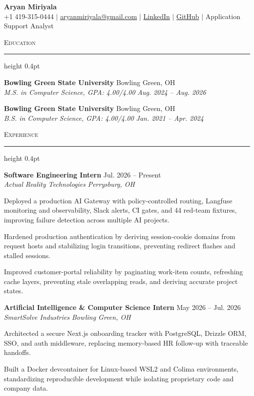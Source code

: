 \documentclass[letterpaper,11pt]{article}
\newcommand{\resumesection}[1]{%
  \par\vspace{2pt}%
  {\large\scshape #1}\par\vspace{2pt}%
  \hrule height 0.4pt\vspace{2pt}%
}
\newcommand{\resumeSubheading}[4]{
  \textbf{#1} \hfill #2\\
  \textit{#3} \hfill \textit{#4}
}
\begin{document}
\begin{center}
  {\LARGE \textbf{Aryan Miriyala}}\\[-1pt]
  \small
  +1 419-315-0444 $|$
  \href{mailto:aryanmiriyala@gmail.com}{aryanmiriyala@gmail.com} $|$
  \href{https://www.linkedin.com/in/aryan-miriyala-7788a21b6/}{LinkedIn} $|$
  \href{https://github.com/aryanmiriyala}{GitHub} $|$
  Application Support Analyst
\end{center}\vspace{-10pt}

\resumesection{Education}
\resumeSubheading
{Bowling Green State University}{Bowling Green, OH}
{M.S. in Computer Science, GPA: 4.00/4.00}{Aug. 2024 -- Aug. 2026}

\resumeSubheading
{Bowling Green State University}{Bowling Green, OH}
{B.S. in Computer Science, GPA: 4.00/4.00}{Jan. 2021 -- Apr. 2024}

\resumesection{Experience}
\resumeSubheading
{Software Engineering Intern}{Jul. 2026 -- Present}
{Actual Reality Technologies}{Perrysburg, OH}
\begin{tightitemize}
  \item Deployed a production AI Gateway with policy-controlled routing, Langfuse monitoring and observability, Slack alerts, CI gates, and 44 red-team fixtures, improving failure detection across multiple AI projects.
  \item Hardened production authentication by deriving session-cookie domains from request hosts and stabilizing login transitions, preventing redirect flashes and stalled sessions.
  \item Improved customer-portal reliability by paginating work-item counts, refreshing cache layers, preventing stale overlapping reads, and deriving accurate project states.
\end{tightitemize}

\resumeSubheading
{Artificial Intelligence \& Computer Science Intern}{May 2026 -- Jul. 2026}
{SmartSolve Industries}{Bowling Green, OH}
\begin{tightitemize}
  \item Architected a secure Next.js onboarding tracker with PostgreSQL, Drizzle ORM, SSO, and auth middleware, replacing memory-based HR follow-up with traceable handoffs.
  \item Built a Docker devcontainer for Linux-based WSL2 and Colima environments, standardizing reproducible development while isolating proprietary code and company data.
\end{tightitemize}
\end{document}
